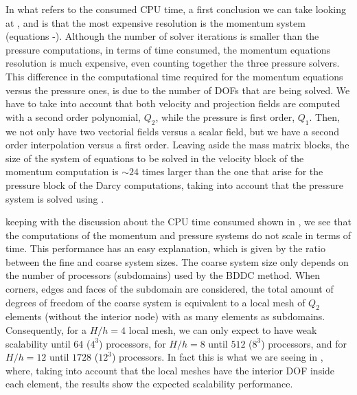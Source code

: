 In what refers to the consumed CPU time, a first conclusion we can take looking at ,  and  is that the most expensive resolution is the momentum system (equations -). Although the number of solver iterations is smaller than the pressure computations, in terms of time consumed, the momentum equations resolution is much expensive, even counting together the three pressure solvers. This difference in the computational time required for the momentum equations versus the pressure ones, is due to the number of DOFs that are being solved. We have to take into account that both velocity and projection fields are computed with a second order polynomial, $ Q_2 $, while the pressure is first order, $ Q_1 $. Then, we not only have two vectorial fields versus a scalar field, but we have a second order interpolation versus a first order. Leaving aside the mass matrix blocks, the size of the system of equations to be solved in the velocity block of the momentum computation is $ \sim24 $ times larger than the one that arise for the pressure block of the Darcy computations, taking into account that the pressure system is solved using .

keeping with the discussion about the CPU time consumed shown in , we see that the computations of the momentum and pressure systems do not scale in terms of time. This performance has an easy explanation, which is given by the ratio between the fine and coarse system sizes. The coarse system size only depends on the number of processors (subdomains) used by the BDDC method. When corners, edges and faces of the subdomain are considered, the total amount of degrees of freedom of the coarse system is equivalent to a local mesh of $ Q_2 $ elements (without the interior node) with as many elements as subdomains. Consequently, for a $ H/h=4 $ local mesh, we can only expect to have weak scalability until $ 64 $ ($ 4^3 $) processors, for $ H/h=8 $ until $ 512 $ ($ 8^3 $) processors, and for $ H/h=12 $ until $ 1728 $ ($ 12^3 $) processors. In fact this is what we are seeing in , where, taking into account that the local meshes have the interior DOF inside each element, the results show the expected scalability performance.

